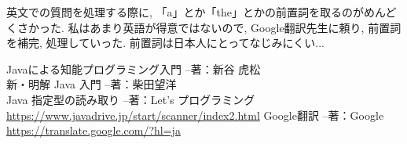 ﻿\documentclass[uplatex,12pt]{jsarticle}
\begin{document}
英文での質問を処理する際に, 「a」とか「the」とかの前置詞を取るのがめんどくさかった. 私はあまり英語が得意ではないので, Google翻訳先生に頼り, 前置詞を補完, 処理していった. 前置詞は日本人にとってなじみにくい...

\begin{thebibliography}{99}
 Javaによる知能プログラミング入門 --著：新谷 虎松 \\
 新・明解 Java 入門 --著：柴田望洋 \\
 Java 指定型の読み取り --著：Let's プログラミング \\
\url{https://www.javadrive.jp/start/scanner/index2.html}
 Google翻訳 --著：Google \\
\url{https://translate.google.com/?hl=ja}
\end{thebibliography}
\end{document}
